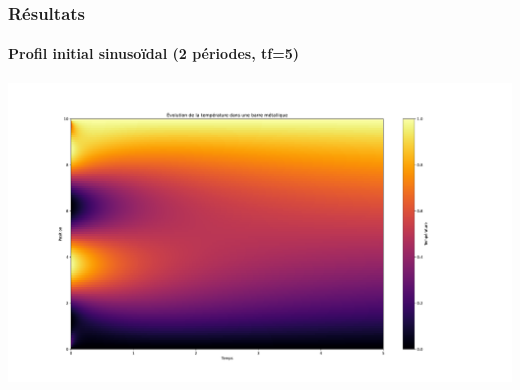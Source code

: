 \documentclass{beamer}
\begin{document}
    \begin{frame}
    \frametitle{Résultats}
    \framesubtitle{Profil initial sinusoïdal (2 périodes, tf=5)}

    \begin{center}
    \includegraphics[width=1.2\linewidth]{figs/Figure_3.pdf}
    \end{center}


    \end{frame}
\end{document}
